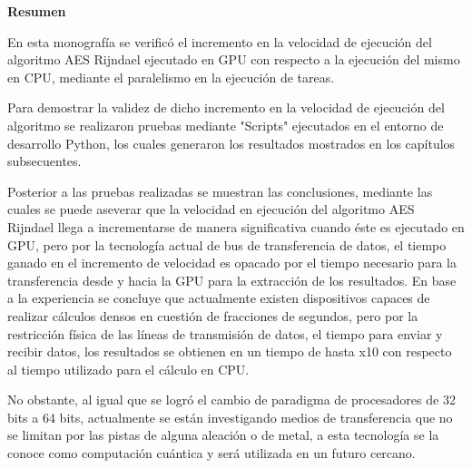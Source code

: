 \documentclass[../main/main.tex]{subfiles}
\begin{document}
  \begin{center}
    \textbf{\large Resumen}
  \end{center}

  En esta monografía se verificó el incremento en la velocidad de ejecución del algoritmo AES Rijndael ejecutado en GPU con respecto a la ejecución del mismo en CPU, mediante el paralelismo en la ejecución de tareas.

  Para demostrar la validez de dicho incremento en la velocidad de ejecución del algoritmo se realizaron pruebas mediante "Scripts" ejecutados en el entorno de desarrollo Python, los cuales generaron los resultados mostrados en los capítulos subsecuentes.

  Posterior a las pruebas realizadas se muestran las conclusiones, mediante las cuales se puede aseverar que la velocidad en ejecución del algoritmo AES Rijndael llega a incrementarse de manera significativa cuando éste es ejecutado en GPU, pero por la tecnología actual de bus de transferencia de datos, el tiempo ganado en el incremento de velocidad es opacado por el tiempo necesario para la transferencia desde y hacia la GPU para la extracción de los resultados. En base a la experiencia se concluye que actualmente existen dispositivos capaces de realizar cálculos densos en cuestión de fracciones de segundos, pero por la restricción física de las líneas de transmisión de datos, el tiempo para enviar y recibir datos, los resultados se obtienen en un tiempo de hasta x10 con respecto al tiempo utilizado para el cálculo en CPU.

  No obstante, al igual que se logró el cambio de paradigma de procesadores de 32 bits a 64 bits, actualmente se están investigando medios de transferencia que no se limitan por las pistas de alguna aleación o de metal, a esta tecnología se la conoce como computación cuántica y será utilizada en un futuro cercano.
\end{document}
